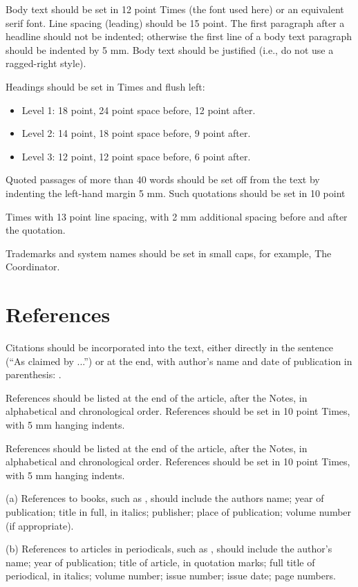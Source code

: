 \documentclass{ecscw2007}
\begin{document}
Body text should be set in 12 point Times (the font used here) or an
equivalent serif font. Line spacing (leading) should be 15 point. The
first paragraph after a headline should not be indented; otherwise the
first line of a body text paragraph should be indented by 5 mm. Body
text should be justified (i.e., do not use a ragged-right style).

Headings should be set in Times and flush left:

\begin{itemize}
\item Level 1: 18 point, 24 point space before, 12 point after. 
\item Level 2: 14 point, 18 point space before, 9 point after. 
\item Level 3: 12 point, 12 point space before, 6 point after. 
\end{itemize}

Quoted passages of more than 40 words should be set off from the text by 
indenting the left-hand margin 5 mm. Such quotations should be set in 10 point 

Times with 13 point line spacing, with 2 mm additional spacing before and after the 
quotation. 

Trademarks and system names should be set in small caps, for example,
{\sc The Coordinator}. 

\section*{References}

Citations should be incorporated into the text, either directly in the
sentence (``As claimed by \cite{bib:Bowers91}...'') or at the end,
with author's name and date of publication in parenthesis:
\citep{bib:Bowers91}.


References should be listed at the end of the article, after the Notes, in 
alphabetical and chronological order. References should be set in 10 point Times, 
with 5 mm hanging indents. 

References should be listed at the end of the article, after the Notes, in 
alphabetical and chronological order. References should be set in 10 point Times, 
with 5 mm hanging indents. 

(a) References to books, such as \citep{bib:Johansen98}, should include
the authors name; year of publication; title in full, in italics;
publisher; place of publication; volume number (if appropriate).

(b) References to articles in periodicals, such as
\citep{bib:gerson86}, should include the author's name; year of
publication; title of article, in quotation marks; full title of
periodical, in italics; volume number; issue number; issue date; page
numbers.
\end{document}
